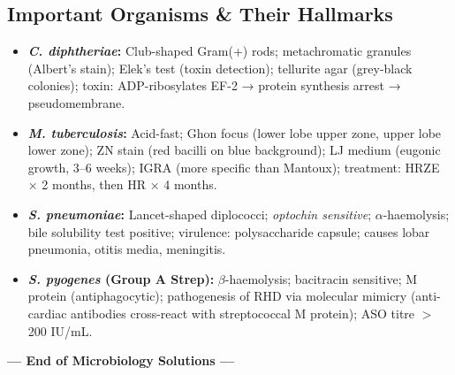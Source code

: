 \documentclass[11pt,a4paper]{article}
\begin{document}
\subsection{Important Organisms \& Their Hallmarks}
\begin{itemize}[leftmargin=*]
    \item \textbf{\textit{C. diphtheriae}:} Club-shaped Gram(+) rods; metachromatic granules (Albert's stain); Elek's test (toxin detection); tellurite agar (grey-black colonies); toxin: ADP-ribosylates EF-2 → protein synthesis arrest → pseudomembrane.
    \item \textbf{\textit{M. tuberculosis}:} Acid-fast; Ghon focus (lower lobe upper zone, upper lobe lower zone); ZN stain (red bacilli on blue background); LJ medium (eugonic growth, 3--6 weeks); IGRA (more specific than Mantoux); treatment: HRZE × 2 months, then HR × 4 months.
    \item \textbf{\textit{S. pneumoniae}:} Lancet-shaped diplococci; \textit{optochin sensitive}; $\alpha$-haemolysis; bile solubility test positive; virulence: polysaccharide capsule; causes lobar pneumonia, otitis media, meningitis.
    \item \textbf{\textit{S. pyogenes} (Group A Strep):} $\beta$-haemolysis; bacitracin sensitive; M protein (antiphagocytic); pathogenesis of RHD via molecular mimicry (anti-cardiac antibodies cross-react with streptococcal M protein); ASO titre $>$200 IU/mL.
\end{itemize}

\vspace{1cm}
\begin{center}
\textbf{--- End of Microbiology Solutions ---}
\end{center}
\end{document}
